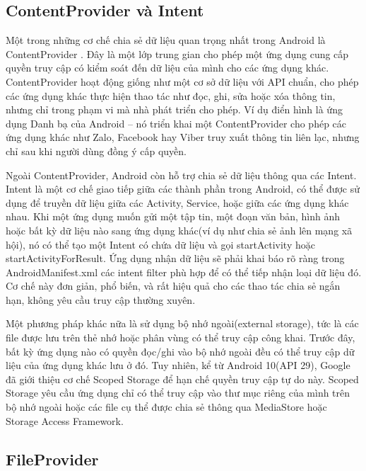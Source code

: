 \subsection{ContentProvider và Intent}    
        Một trong những cơ chế chia sẻ dữ liệu quan trọng nhất trong Android là ContentProvider \cite{Content-Providers}. Đây là một lớp trung gian cho phép một ứng dụng cung cấp quyền truy cập có kiểm soát đến dữ liệu của mình cho các ứng dụng khác. ContentProvider hoạt động giống như một cơ sở dữ liệu với API chuẩn, cho phép các ứng dụng khác thực hiện thao tác như đọc, ghi, sửa hoặc xóa thông tin, nhưng chỉ trong phạm vi mà nhà phát triển cho phép. Ví dụ điển hình là ứng dụng Danh bạ của Android – nó triển khai một ContentProvider cho phép các ứng dụng khác như Zalo, Facebook hay Viber truy xuất thông tin liên lạc, nhưng chỉ sau khi người dùng đồng ý cấp quyền.

        \vspace{0.5em}

        Ngoài ContentProvider, Android còn hỗ trợ chia sẻ dữ liệu thông qua các Intent. Intent là một cơ chế giao tiếp giữa các thành phần trong Android, có thể được sử dụng để truyền dữ liệu giữa các Activity, Service, hoặc giữa các ứng dụng khác nhau. Khi một ứng dụng muốn gửi một tập tin, một đoạn văn bản, hình ảnh hoặc bất kỳ dữ liệu nào sang ứng dụng khác(ví dụ như chia sẻ ảnh lên mạng xã hội), nó có thể tạo một Intent có chứa dữ liệu và gọi startActivity hoặc startActivityForResult. Ứng dụng nhận dữ liệu sẽ phải khai báo rõ ràng trong AndroidManifest.xml các intent filter phù hợp để có thể tiếp nhận loại dữ liệu đó. Cơ chế này đơn giản, phổ biến, và rất hiệu quả cho các thao tác chia sẻ ngắn hạn, không yêu cầu truy cập thường xuyên.

        \vspace{0.5em}

        Một phương pháp khác nữa là sử dụng bộ nhớ ngoài(external storage), tức là các file được lưu trên thẻ nhớ hoặc phân vùng có thể truy cập công khai. Trước đây, bất kỳ ứng dụng nào có quyền đọc/ghi vào bộ nhớ ngoài đều có thể truy cập dữ liệu của ứng dụng khác lưu ở đó. Tuy nhiên, kể từ Android 10(API 29), Google đã giới thiệu cơ chế Scoped Storage để hạn chế quyền truy cập tự do này. Scoped Storage yêu cầu ứng dụng chỉ có thể truy cập vào thư mục riêng của mình trên bộ nhớ ngoài hoặc các file cụ thể được chia sẻ thông qua MediaStore hoặc Storage Access Framework.

\subsection{FileProvider}
\renewcommand{\labelitemi}{--}   

